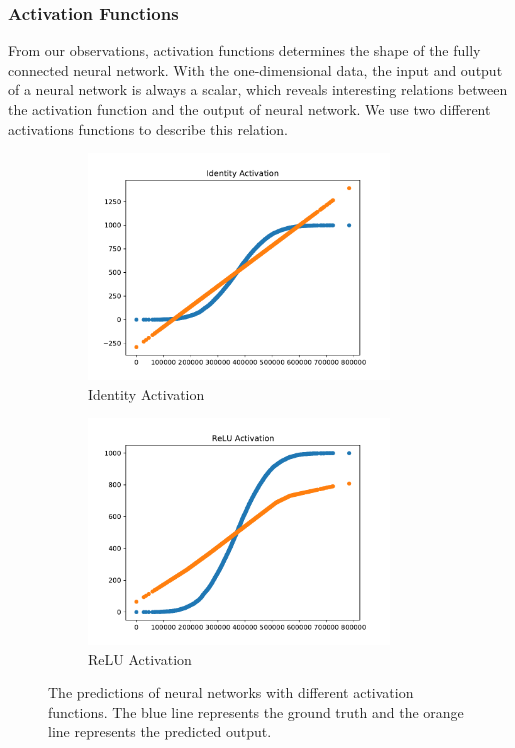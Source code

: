 \subsubsection{Activation Functions}

From our observations, activation functions determines the shape of the fully connected neural network. With the one-dimensional data, the input and output of a neural network is always a scalar, which reveals interesting relations between the activation function and the output of neural network. We use two different activations functions to describe this relation.

\begin{figure}[!htb]
\begin{subfigure}[b]{0.5\textwidth}
	\centering
	\includegraphics[width=8cm]{graphs/insights/identity}
	\caption{Identity Activation}
	\label{fig:id_act}
\end{subfigure}
\hfill
\begin{subfigure}[b]{0.5\textwidth}
	\centering
	\includegraphics[width=8cm]{graphs/insights/relu}	
	\caption{ReLU Activation}
	\label{fig:relu_act}
\end{subfigure}
\caption{The predictions of neural networks with different activation functions. The blue line represents the ground truth and the orange line represents the predicted output.}
\label{fig:relation_of_activation_function}
\end{figure}


